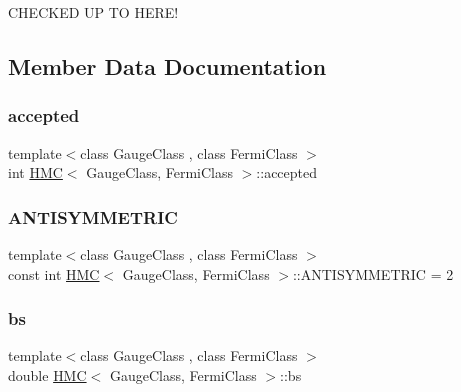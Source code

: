 C\+H\+E\+C\+K\+ED UP TO H\+E\+R\+E! 

\subsection{Member Data Documentation}
\mbox{\label{class_h_m_c_a11cb072cbdfddf4f6f6055bc77ae6b3a}} 
\subsubsection{\texorpdfstring{accepted}{accepted}}
{\footnotesize\ttfamily template$<$class Gauge\+Class , class Fermi\+Class $>$ \\
int \hyperlink{class_h_m_c}{H\+MC}$<$ Gauge\+Class, Fermi\+Class $>$\+::accepted}

\mbox{\label{class_h_m_c_a2be12d54de2a0c63f56f8a7168780f5d}} 
\subsubsection{\texorpdfstring{A\+N\+T\+I\+S\+Y\+M\+M\+E\+T\+R\+IC}{ANTISYMMETRIC}}
{\footnotesize\ttfamily template$<$class Gauge\+Class , class Fermi\+Class $>$ \\
const int \hyperlink{class_h_m_c}{H\+MC}$<$ Gauge\+Class, Fermi\+Class $>$\+::A\+N\+T\+I\+S\+Y\+M\+M\+E\+T\+R\+IC = 2\hspace{0.3cm}{\ttfamily [static]}}

\mbox{\label{class_h_m_c_a940413017301b1520e4c6108a527c7c9}} 
\subsubsection{\texorpdfstring{bs}{bs}}
{\footnotesize\ttfamily template$<$class Gauge\+Class , class Fermi\+Class $>$ \\
double \hyperlink{class_h_m_c}{H\+MC}$<$ Gauge\+Class, Fermi\+Class $>$\+::bs}

\mbox{\label{class_h_m_c_a4146b7b06fcf3410b9bfda1c88c5fe39}} 
